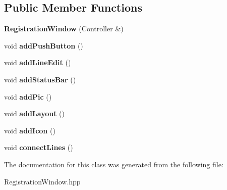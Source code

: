 \subsection*{Public Member Functions}
\begin{DoxyCompactItemize}
\item 
{\bfseries Registration\+Window} (Controller \&)\hypertarget{classRegistrationWindow_ac8876ad29199208fc8b8bd25863c9318}{}\label{classRegistrationWindow_ac8876ad29199208fc8b8bd25863c9318}

\item 
void {\bfseries add\+Push\+Button} ()\hypertarget{classRegistrationWindow_a8ae5035dbe91465a32647f8c761ca0a2}{}\label{classRegistrationWindow_a8ae5035dbe91465a32647f8c761ca0a2}

\item 
void {\bfseries add\+Line\+Edit} ()\hypertarget{classRegistrationWindow_a2b4f3c2cc9e9574a236c9a40f8c8fd4c}{}\label{classRegistrationWindow_a2b4f3c2cc9e9574a236c9a40f8c8fd4c}

\item 
void {\bfseries add\+Status\+Bar} ()\hypertarget{classRegistrationWindow_a48b7beed7a7fc741fe706be3de9e6c69}{}\label{classRegistrationWindow_a48b7beed7a7fc741fe706be3de9e6c69}

\item 
void {\bfseries add\+Pic} ()\hypertarget{classRegistrationWindow_ad7b9bb0bc0e359c5383b65534b7f0004}{}\label{classRegistrationWindow_ad7b9bb0bc0e359c5383b65534b7f0004}

\item 
void {\bfseries add\+Layout} ()\hypertarget{classRegistrationWindow_ac90214333ddffff0539e9df9bc40eafa}{}\label{classRegistrationWindow_ac90214333ddffff0539e9df9bc40eafa}

\item 
void {\bfseries add\+Icon} ()\hypertarget{classRegistrationWindow_a97caee1871c235a06bb91ae0bf2674cf}{}\label{classRegistrationWindow_a97caee1871c235a06bb91ae0bf2674cf}

\item 
void {\bfseries connect\+Lines} ()\hypertarget{classRegistrationWindow_af09a56afbb0978a3e9e04388540a8866}{}\label{classRegistrationWindow_af09a56afbb0978a3e9e04388540a8866}

\end{DoxyCompactItemize}


The documentation for this class was generated from the following file\+:\begin{DoxyCompactItemize}
\item 
Registration\+Window.\+hpp\end{DoxyCompactItemize}
